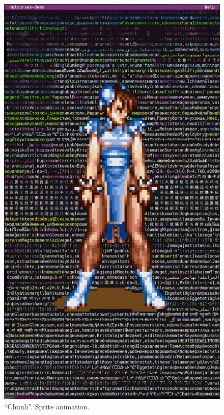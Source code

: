 \documentclass[letterpaper,10pt]{article}
\begin{document}
\begin{figure}
  \centering \includegraphics[width=.75\linewidth]{media/demo-chunli2.png}
  \caption{``Chunli''. Sprite animation.}
\end{figure}
\end{document}
